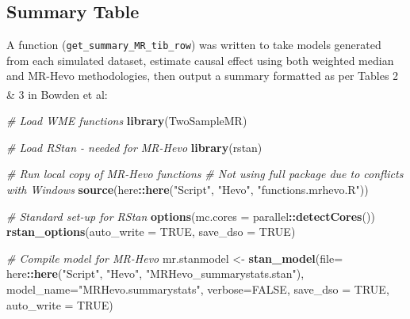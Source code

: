 \documentclass[
]{article}
\newenvironment{Shaded}{\begin{snugshade}}{\end{snugshade}}
\newcommand{\AttributeTok}[1]{\textcolor[rgb]{0.13,0.29,0.53}{#1}}
\newcommand{\CommentTok}[1]{\textcolor[rgb]{0.56,0.35,0.01}{\textit{#1}}}
\newcommand{\ConstantTok}[1]{\textcolor[rgb]{0.56,0.35,0.01}{#1}}
\newcommand{\FunctionTok}[1]{\textcolor[rgb]{0.13,0.29,0.53}{\textbf{#1}}}
\newcommand{\NormalTok}[1]{#1}
\newcommand{\OtherTok}[1]{\textcolor[rgb]{0.56,0.35,0.01}{#1}}
\newcommand{\SpecialCharTok}[1]{\textcolor[rgb]{0.81,0.36,0.00}{\textbf{#1}}}
\newcommand{\StringTok}[1]{\textcolor[rgb]{0.31,0.60,0.02}{#1}}
\begin{document}
\newpage

\subsection{Summary Table}\label{appendix-sim-summ}

A function (\texttt{get\_summary\_MR\_tib\_row}) was written to take models generated from each simulated dataset, estimate causal effect using both weighted median and MR-Hevo methodologies, then output a summary formatted as per Tables 2 \& 3 in Bowden et al\textsuperscript{}:

\begin{Shaded}
\begin{Highlighting}[]
\CommentTok{\# Load WME functions}
\FunctionTok{library}\NormalTok{(TwoSampleMR)}

\CommentTok{\# Load RStan {-} needed for MR{-}Hevo}
\FunctionTok{library}\NormalTok{(rstan)}


\CommentTok{\# Run local copy of MR{-}Hevo functions}
\CommentTok{\# Not using full package due to conflicts with Windows}
\FunctionTok{source}\NormalTok{(here}\SpecialCharTok{::}\FunctionTok{here}\NormalTok{(}\StringTok{"Script"}\NormalTok{, }\StringTok{"Hevo"}\NormalTok{, }\StringTok{"functions.mrhevo.R"}\NormalTok{))}

\CommentTok{\# Standard set{-}up for RStan}
\FunctionTok{options}\NormalTok{(}\AttributeTok{mc.cores =}\NormalTok{ parallel}\SpecialCharTok{::}\FunctionTok{detectCores}\NormalTok{())}
\FunctionTok{rstan\_options}\NormalTok{(}\AttributeTok{auto\_write =} \ConstantTok{TRUE}\NormalTok{, }\AttributeTok{save\_dso =} \ConstantTok{TRUE}\NormalTok{)}


\CommentTok{\# Compile model for MR{-}Hevo}
\NormalTok{mr.stanmodel }\OtherTok{\textless{}{-}} \FunctionTok{stan\_model}\NormalTok{(}\AttributeTok{file=}\NormalTok{ here}\SpecialCharTok{::}\FunctionTok{here}\NormalTok{(}\StringTok{"Script"}\NormalTok{, }
                                            \StringTok{"Hevo"}\NormalTok{, }
                                            \StringTok{"MRHevo\_summarystats.stan"}\NormalTok{),}
                           \AttributeTok{model\_name=}\StringTok{"MRHevo.summarystats"}\NormalTok{, }
                           \AttributeTok{verbose=}\ConstantTok{FALSE}\NormalTok{,}
                           \AttributeTok{save\_dso =} \ConstantTok{TRUE}\NormalTok{,}
                           \AttributeTok{auto\_write =} \ConstantTok{TRUE}\NormalTok{)}


\end{Highlighting}
\end{Shaded}
\end{document}
